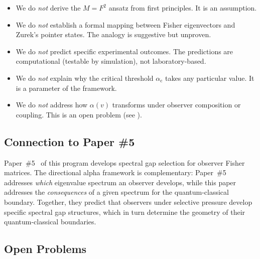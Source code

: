 \documentclass[11pt,a4paper]{article}
\theoremstyle{plain}
\theoremstyle{definition}
\newcommand{\alphac}{\alpha_{\mathrm{c}}}
\begin{document}
\begin{itemize}[noitemsep]
\item We do \emph{not} derive the $M = F^2$ ansatz from first
  principles.  It is an assumption.

\item We do \emph{not} establish a formal mapping between Fisher
  eigenvectors and Zurek's pointer states.  The analogy is
  suggestive but unproven.

\item We do \emph{not} predict specific experimental outcomes.
  The predictions are computational (testable by simulation),
  not laboratory-based.

\item We do \emph{not} explain why the critical threshold
  $\alphac$ takes any particular value.  It is a parameter of
  the framework.

\item We do \emph{not} address how $\alpha(v)$ transforms under
  observer composition or coupling.  This is an open problem
  (see ).
\end{itemize}


\subsection{Connection to Paper \#5}

Paper~\#5~\cite{companion_spectral} of this program develops
spectral gap selection for observer Fisher matrices.  The
directional alpha framework is complementary: Paper~\#5 addresses
\emph{which} eigenvalue spectrum an observer develops, while this
paper addresses the \emph{consequences} of a given spectrum for
the quantum-classical boundary.  Together, they predict that
observers under selective pressure develop specific spectral
gap structures, which in turn determine the geometry of their
quantum-classical boundaries.

\subsection{Open Problems}
\label{sec:open}
\end{document}
